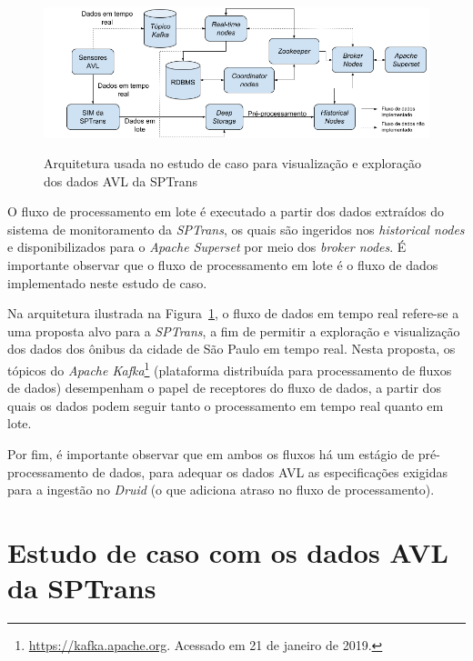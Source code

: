 \documentclass[
	12pt,				%
	oneside,			%
	a4paper,			%
	english,			%
	brazil				%
	]{abntex2ppgsi}
\begin{document}
{{{\begin{figure}[!htb]%
	\centering
 	  \caption{Arquitetura usada no estudo de caso para visualização e exploração dos dados AVL da SPTrans}
		\includegraphics[width=1\linewidth]{images/viz_arch_pt.png}
	\label{fig:viz_arch}
\end{figure}

O fluxo de processamento em lote é executado a partir dos dados extraídos do sistema de monitoramento da \textit{SPTrans}, os quais são ingeridos nos \textit{historical nodes} 
e disponibilizados para o \textit{Apache Superset} por meio dos \textit{broker nodes}. 
É importante observar que o fluxo de processamento em lote é o fluxo de dados implementado neste estudo de caso.

Na arquitetura ilustrada na Figura~\ref{fig:viz_arch}, o fluxo de dados em tempo real refere-se a uma proposta alvo para a \textit{SPTrans}, a fim de permitir a exploração e visualização dos dados dos ônibus da cidade de São Paulo em tempo real. Nesta proposta, os tópicos do \textit{Apache Kafka}\footnote{\url{https://kafka.apache.org}. Acessado em 21 de janeiro de 2019.} (plataforma distribuída para processamento de fluxos de dados) desempenham o papel de receptores do fluxo de dados, a partir dos quais os dados podem seguir tanto o processamento em tempo real quanto em lote.

Por fim, é importante observar que em ambos os fluxos há um estágio de pré-processamento de dados, para adequar os dados AVL as especificações exigidas para a ingestão no \textit{Druid} (o que adiciona atraso no fluxo de processamento).

\section{Estudo de caso com os dados AVL da SPTrans}
\label{viz_case}

}}}
\end{document}
